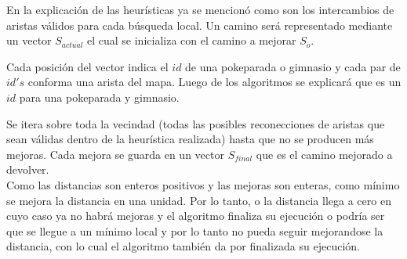 En la explicación de las heurísticas ya se mencionó como son los intercambios de aristas válidos para cada búsqueda local. Un camino será representado mediante un vector $S_{actual}$ el cual se inicializa con el camino a mejorar $S_o$. 

Cada posición del vector indica el $id$ de una pokeparada o gimnasio y cada par de $id's$ conforma una arista del mapa. Luego de los algoritmos se explicará que es un $id$ para una pokeparada y gimnasio.
 
Se itera sobre toda la vecindad (todas las posibles reconecciones de aristas que sean válidas dentro de la heurística realizada) hasta que no se producen más mejoras. Cada mejora se guarda en un vector $S_{final}$ que es el camino mejorado a devolver.\\
Como las distancias son enteros positivos y las mejoras son enteras, como mínimo se mejora la distancia en una unidad. Por lo tanto, o la distancia llega a cero en cuyo caso ya no habrá mejoras y el algoritmo finaliza su ejecución o podría ser que se llegue a un mínimo local y por lo tanto no pueda seguir mejorandose la distancia, con lo cual el algoritmo también da por finalizada su ejecución.

